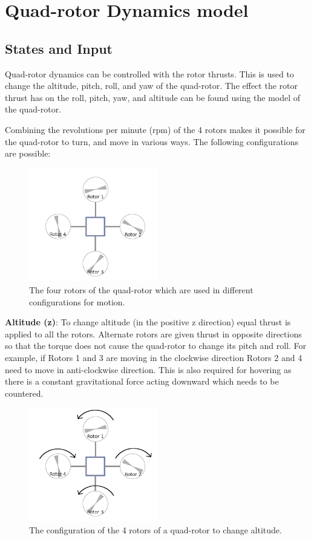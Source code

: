 \documentclass[hidelinks,BTech]{iitmdiss}
\begin{document}
\chapter{Quad-rotor Dynamics model}

\section{States and Input}
Quad-rotor dynamics can be controlled with the rotor thrusts. This is used to change the altitude, pitch, roll, and yaw of the quad-rotor. The effect the rotor thrust has on the roll, pitch, yaw, and altitude can be found using the model of the quad-rotor.

Combining the revolutions per minute (rpm) of the 4 rotors makes it possible for the quad-rotor to turn, and move in various ways. The following configurations are possible:

\begin{figure}[H]
  \centering
    \includegraphics[width=0.5\textwidth]{quadrotor_rotors_names.png}
    \caption{The four rotors of the quad-rotor which are used in different configurations for motion.}
\end{figure}

{\bf Altitude (z)}: To change altitude (in the positive z direction) equal thrust is applied to all the rotors. Alternate rotors are given thrust in opposite directions so that the torque does not cause the quad-rotor to change its pitch and roll. For example, if Rotors 1 and 3 are moving in the clockwise direction Rotors 2 and 4 need to move in anti-clockwise direction. This is also required for hovering as there is a constant gravitational force acting downward which needs to be countered.

\begin{figure}[H]
  \centering
    \includegraphics[width=0.5\textwidth]{quadrotor_rotors_altitude.png}
    \caption{The configuration of the 4 rotors of a quad-rotor to change altitude.}
\end{figure}
\end{document}
